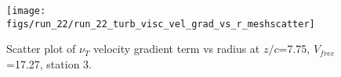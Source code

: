 \begin{figure}[H]
\centering
\texttt{[image: figs/run\_22/run\_22\_turb\_visc\_vel\_grad\_vs\_r\_meshscatter]}
\caption{Scatter plot of $\nu_T$ velocity gradient term vs radius at $z/c$=7.75, $V_{free}$=17.27, station 3.}
\label{fig:run_22_turb_visc_vel_grad_vs_r_meshscatter}
\end{figure}


